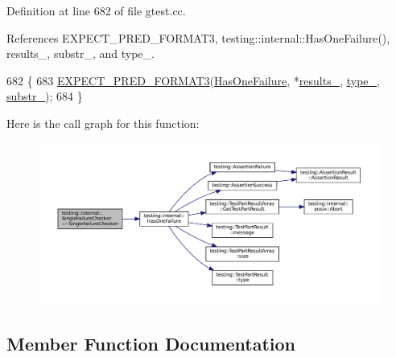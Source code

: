 Definition at line 682 of file gtest.\+cc.



References E\+X\+P\+E\+C\+T\+\_\+\+P\+R\+E\+D\+\_\+\+F\+O\+R\+M\+A\+T3, testing\+::internal\+::\+Has\+One\+Failure(), results\+\_\+, substr\+\_\+, and type\+\_\+.


\begin{DoxyCode}
682                                             \{
683   \hyperlink{gtest__pred__impl_8h_a7285708fa5d37d6d8ed5b5e59da08bae}{EXPECT\_PRED\_FORMAT3}(\hyperlink{namespacetesting_1_1internal_a14ff02e6d151f45e998657674e9af88a}{HasOneFailure}, *\hyperlink{classtesting_1_1internal_1_1SingleFailureChecker_af6216677e2186e9481088daf57c17d21}{results\_}, 
      \hyperlink{classtesting_1_1internal_1_1SingleFailureChecker_a8fc33138c357b2a6ede3698eb57548a7}{type\_}, \hyperlink{classtesting_1_1internal_1_1SingleFailureChecker_a2003215f5f3147726e0b3bb4c8954d71}{substr\_});
684 \}
\end{DoxyCode}
Here is the call graph for this function\+:
\nopagebreak
\begin{figure}[H]
\begin{center}
\leavevmode
\includegraphics[width=350pt]{classtesting_1_1internal_1_1SingleFailureChecker_a4b0a907c9c1b350c79d70af138e9f0bf_cgraph}
\end{center}
\end{figure}


\subsection{Member Function Documentation}
\mbox{\label{classtesting_1_1internal_1_1SingleFailureChecker_a381cef530568cc08d07dfa2a5dcfc233}} 
